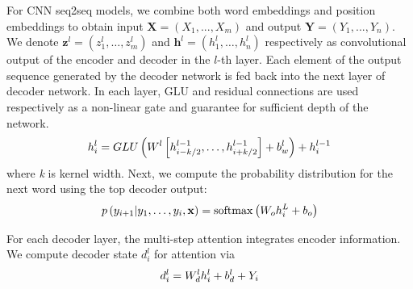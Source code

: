 
For CNN seq2seq models, we combine both word embeddings and position embeddings to obtain input $\mathbf{X} = (X_1,...,X_m)$ and output $\mathbf{Y}=(Y_1,...,Y_n)$. 
We denote $\mathbf { z } ^ { l } = \left( z _ { 1 } ^ { l } , \ldots , z _ { m     } ^ { l } \right)$ and $\mathbf { h } ^ { l } = \left( h _ { 1 } ^ { l } , \ldots , h _ { n } ^ { l } \right)$ 
respectively as convolutional output of the encoder and
decoder in the $l$-th layer.
Each element of the output
sequence generated by the decoder network is fed
back into the next layer of decoder network.
In each layer, GLU \cite{DauphinFAG17} and residual connections \cite{HeZRS16}
are used respectively as a non-linear gate and guarantee for sufficient depth of the network.  
\begin{equation}
\small
    h _ { i } ^ { l } = GLU \left( W ^ { l } \left[ h _ {i-k/2 } ^ { l - 1 } , \ldots , h _ { i+k/2 } ^ { l - 1 } \right] + b _ { w } ^ { l } \right) + h _ { i } ^ { l - 1 }
\end{equation} 
where \textit{k} is kernel width.
Next, we compute the probability distribution for the next word
using the top decoder output:
\begin{equation}
\small
    p \left( y _ { i + 1 } | y _ { 1 } , \ldots , y _ { i } , \mathbf { x } \right) = \operatorname { softmax } \left( W _ { o } h _ { i } ^ { L } + b _ { o } \right)
\end{equation}

For each decoder layer, the multi-step attention integrates encoder information. 
We compute decoder state $d_{i}^{l}$ for attention via
\begin{equation}
\small
    d _ { i } ^ { l } = W _ { d } ^ { l } h _ { i } ^ { l } + b _ { d } ^ { l } + Y _ { i }
\end{equation}

